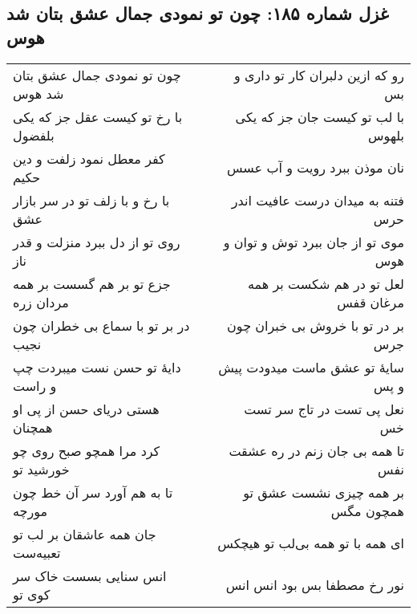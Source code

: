 \begin{center}
\section*{غزل شماره ۱۸۵: چون تو نمودی جمال عشق بتان شد هوس}
\label{sec:185}
\begin{longtable}{l p{0.5cm} r}
چون تو نمودی جمال عشق بتان شد هوس
&&
رو که ازین دلبران کار تو داری و بس
\\
با رخ تو کیست عقل جز که یکی بلفضول
&&
با لب تو کیست جان جز که یکی بلهوس
\\
کفر معطل نمود زلفت و دین حکیم
&&
نان موذن ببرد رویت و آب عسس
\\
با رخ و با زلف تو در سر بازار عشق
&&
فتنه به میدان درست عافیت اندر حرس
\\
روی تو از دل ببرد منزلت و قدر ناز
&&
موی تو از جان ببرد توش و توان و هوس
\\
جزع تو بر هم گسست بر همه مردان زره
&&
لعل تو در هم شکست بر همه مرغان قفس
\\
در بر تو با سماع بی خطران چون نجیب
&&
بر در تو با خروش بی خبران چون جرس
\\
دایهٔ تو حسن نست میبردت چپ و راست
&&
سایهٔ تو عشق ماست میدودت پیش و پس
\\
هستی دریای حسن از پی او همچنان
&&
نعل پی تست در تاج سر تست خس
\\
کرد مرا همچو صبح روی چو خورشید تو
&&
تا همه بی جان زنم در ره عشقت نفس
\\
تا به هم آورد سر آن خط چون مورچه
&&
بر همه چیزی نشست عشق تو همچون مگس
\\
جان همه عاشقان بر لب تو تعبیه‌ست
&&
ای همه با تو همه بی‌لب تو هیچکس
\\
انس سنایی بسست خاک سر کوی تو
&&
نور رخ مصطفا بس بود انس انس
\\
\end{longtable}
\end{center}
